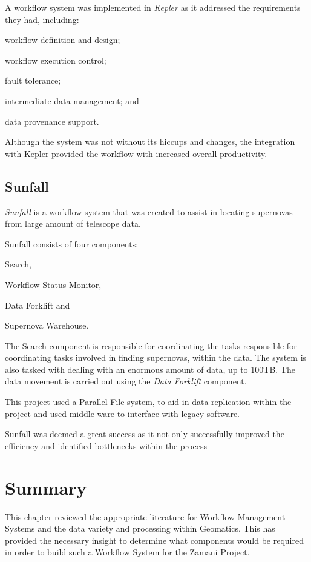       A workflow system was implemented in \emph{Kepler} as it addressed the
      requirements they had, including: \begin{inparaenum}[(i)] \item workflow
      definition and design; \item workflow execution control; \item fault
      tolerance; \item intermediate data management; and \item data provenance
      support.  \end{inparaenum}

      Although the system was not without its hiccups and changes, the
      integration with Kepler provided the workflow with increased overall
      productivity.

    \subsection*{Sunfall}
      \emph{Sunfall} is a workflow system that was created to assist in locating
      supernovas from large amount of telescope data\cite{Aragon:2009:WMH:1529282.1529491}.
       
      Sunfall consists of four components: \begin{inparaenum}[(i)]\item Search, \item 
      Workflow Status Monitor, \item Data Forklift and \item Supernova Warehouse.\end{inparaenum} 
      
      The Search component is responsible for coordinating the tasks responsible for 
      coordinating tasks involved in finding supernovas, within the data. The system
      is also tasked with dealing with an enormous amount of data, up to 100TB. The
      data movement is carried out using the \emph{Data Forklift} component.

      This project used a Parallel File system, to aid in data replication within the
      project and used middle ware to interface with legacy software.

      Sunfall was deemed a great success as it not only successfully improved the
      efficiency and identified bottlenecks within the process


\section{Summary}
This chapter reviewed the appropriate literature for Workflow Management Systems
and the data variety and processing within Geomatics. This has provided the necessary
insight to determine what components would be required in order to build such a Workflow
System for the Zamani Project.

